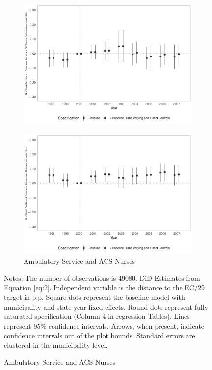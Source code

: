\begin{figure}[h!]
\begin{center}
\begin{subfigure}{0.32\textwidth}
        \includegraphics[width=\textwidth]{plots/sia_ncnes_outpsf_pcapita_dist_ec29_baseline_dist_ec29_baseline_13.pdf}
    \end{subfigure}
    \begin{subfigure}{0.32\textwidth}
        \centering
        \caption{\scriptsize Ambulatory Service and ACS Nurses}\label{fig:13h}
        \includegraphics[width=\textwidth]{plots/sia_ncnes_enfacs_pcapita_dist_ec29_baseline_dist_ec29_baseline_13.pdf}
    \end{subfigure}
    
    \end{center}
    
                \scriptsize{Notes: The number of observations is 49080. DiD Estimates from Equation \ref{eq:2}. Independent variable is the distance to the EC/29 target in p.p. Square dots represent the baseline model with municipality and state-year fixed effects. Round dots represent fully saturated specification (Column 4 in regression Tables). Lines represent 95\% confidence intervals. Arrows, when present, indicate confidence intervals out of the plot bounds. Standard errors are clustered in the municipality level.}
    
\end{figure}